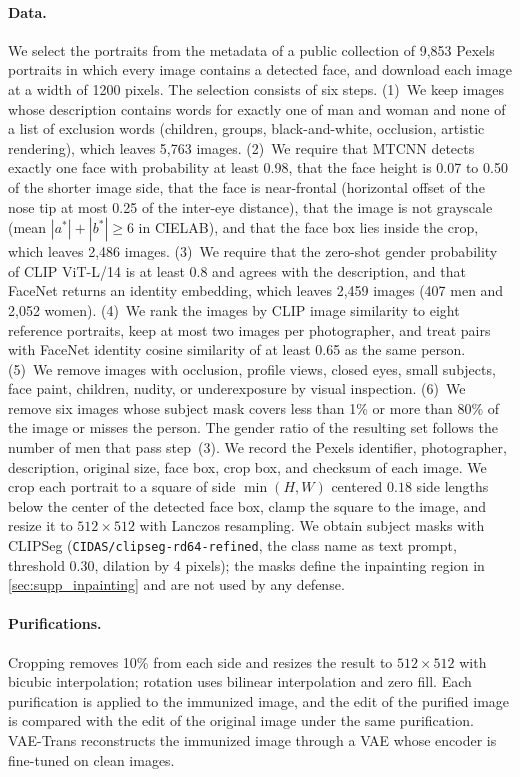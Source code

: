 \paragraph{Data.} We select the portraits from the metadata of a public collection of 9{,}853 Pexels portraits in which every image contains a detected face, and download each image at a width of 1200 pixels. The selection consists of six steps. (1)~We keep images whose description contains words for exactly one of man and woman and none of a list of exclusion words (children, groups, black-and-white, occlusion, artistic rendering), which leaves 5{,}763 images. (2)~We require that MTCNN detects exactly one face with probability at least 0.98, that the face height is 0.07 to 0.50 of the shorter image side, that the face is near-frontal (horizontal offset of the nose tip at most 0.25 of the inter-eye distance), that the image is not grayscale (mean $|a^*| + |b^*| \ge 6$ in CIELAB), and that the face box lies inside the crop, which leaves 2{,}486 images. (3)~We require that the zero-shot gender probability of CLIP ViT-L/14 is at least 0.8 and agrees with the description, and that FaceNet returns an identity embedding, which leaves 2{,}459 images (407 men and 2{,}052 women). (4)~We rank the images by CLIP image similarity to eight reference portraits, keep at most two images per photographer, and treat pairs with FaceNet identity cosine similarity of at least 0.65 as the same person. (5)~We remove images with occlusion, profile views, closed eyes, small subjects, face paint, children, nudity, or underexposure by visual inspection. (6)~We remove six images whose subject mask covers less than 1\% or more than 80\% of the image or misses the person. The gender ratio of the resulting set follows the number of men that pass step~(3). We record the Pexels identifier, photographer, description, original size, face box, crop box, and checksum of each image. We crop each portrait to a square of side $\min(H, W)$ centered $0.18$ side lengths below the center of the detected face box, clamp the square to the image, and resize it to $512\times512$ with Lanczos resampling. We obtain subject masks with CLIPSeg (\texttt{CIDAS/clipseg-rd64-refined}, the class name as text prompt, threshold 0.30, dilation by 4 pixels); the masks define the inpainting region in \cref{sec:supp_inpainting} and are not used by any defense.

\paragraph{Purifications.} Cropping removes 10\% from each side and resizes the result to $512\times512$ with bicubic interpolation; rotation uses bilinear interpolation and zero fill. Each purification is applied to the immunized image, and the edit of the purified image is compared with the edit of the original image under the same purification. VAE-Trans reconstructs the immunized image through a VAE whose encoder is fine-tuned on clean images.

